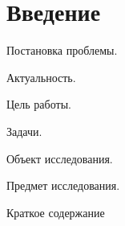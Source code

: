 \chapter*{Введение}

Постановка проблемы.

Актуальность.

Цель работы.

Задачи.

Объект исследования.

Предмет исследования.

Краткое содержание
